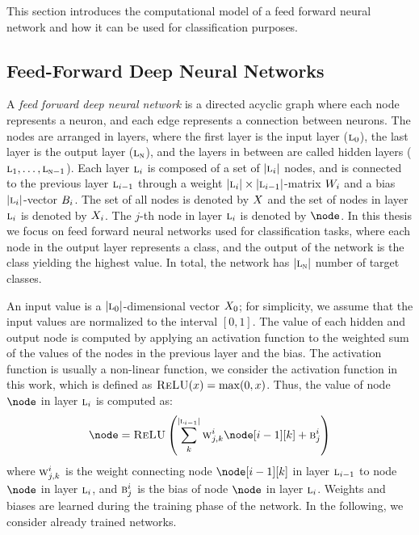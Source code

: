 This section introduces the computational model of a feed forward neural network and how it can be used for classification purposes.

\subsection{Feed-Forward Deep Neural Networks}

A \emph{feed forward deep neural network} is a directed acyclic graph where each node represents a neuron, and each edge represents a connection between neurons.
The nodes are arranged in layers, where the first layer is the input layer ($\textsc{l}_0$), the last layer is the output layer ($\textsc{l}_{\textsc{n}}$), and the layers in between are called hidden layers ($\textsc{l}_{1},\ldots,\textsc{l}_{\textsc{n}-1}$).
Each layer $\textsc{l}_{i}$ is composed of a set of $|\textsc{l}_{i}|$ nodes, and is connected to the previous layer $\textsc{l}_{i-1}$ through a weight $|\textsc{l}_{i}|\times|\textsc{l}_{i-1}|$-matrix $W_{i}$ and a bias $|\textsc{l}_{i}|$-vector $B_{i}$.
The set of all nodes is denoted by $X$ and the set of nodes in layer $\textsc{l}_{i}$ is denoted by $X_{i}$. The $j$-th node in layer $\textsc{l}_{i}$ is denoted by $\node$.
In this thesis we focus on feed forward neural networks used for classification tasks, where each node in the output layer represents a class, and the output of the network is the class yielding the highest value. In total, the network has $|\textsc{l}_{\textsc{n}}|$ number of target classes.

An input value is a $|\textsc{l}_0|$-dimensional vector $X_{0}$; for simplicity, we assume that the input values are normalized to the interval $[0,1]$.
The value of each hidden and output node is computed by applying an activation function to the weighted sum of the values of the nodes in the previous layer and the bias. The activation function is usually a non-linear function, we consider the \relu{} activation function in this work, which is defined as $\textsc{ReLU}(x) = \max(0,x)$. Thus, the value of node $\node$ in layer $\textsc{l}_{i}$ is computed as:
\begin{align*}
  \node = \relu\left(
    \sum_{k}^{\cardinalitynospaces{\hiddenlayer{i-1}}}\weight_{j, k}^{i} \node[i-1][k] + \bias_{j}^{i}
  \right)
\end{align*}
where $\textsc{w}_{j, k}^{i}$ is the weight connecting node $\node[i-1][k]$ in layer $\textsc{l}_{i-1}$ to node $\node$ in layer $\textsc{l}_{i}$, and $\textsc{b}_{j}^{i}$ is the bias of node $\node$ in layer $\textsc{l}_{i}$. Weights and biases are learned during the training phase of the network. In the following, we consider already trained networks.


